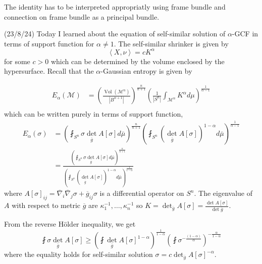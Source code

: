 \documentclass[12pt,a4paper]{article}
\begin{document}
The identity has to be interpreted appropriatly using frame bundle and connection on frame bundle as a principal bundle. 

(23/8/24) Today I learned about the equation of self-similar solution of $ \alpha $-GCF in terms of support function for $ \alpha \neq 1 $. The self-similar shrinker is given by 
\[ \left< X,\nu \right> = c K^{\alpha}\]
for some $ c>0 $ which can be determined by the volume enclosed by the hypersurface. Recall that the $ \alpha $-Gaussian entropy is given by 

\begin{align*}
   E_{\alpha}(\mathcal{M}) & = \left(\frac{\operatorname{Vol}\left(\mathcal{M}^n\right)}{\left|B^{n+1}\right|}\right)^{\frac{n}{n+1}}\left(\frac{1}{\left|S^n\right|} \int_{\mathcal{M}^n} K^\alpha d \mu\right)^{\frac{1}{\alpha-1}} \\
\end{align*}
which can be written purely in terms of support function, 
\begin{align*}
   E_{\alpha}(\sigma) &= \left( \fint_{S^{n}} \sigma \det_{\overline{g}} A[\sigma] d\bar{\mu}\right)^{\frac{n}{n+1}} \left( \fint_{S^{n}} (\det_{\overline{g}} A[\sigma])^{1-\alpha} d \bar{\mu} \right)^{\frac{1}{\alpha -1}}\\
   & = \frac{\left( \fint_{S^{n}} \sigma \det_{\overline{g}} A[\sigma] d\bar{\mu}\right)^{\frac{n}{n+1}}}{\left( \fint_{S^{n}} (\det_{\overline{g}} A[\sigma])^{1-\alpha} d \bar{\mu} \right)^{\frac{1}{1-\alpha}}}
\end{align*}
where $ A[\sigma]_{ij} = \overline{\nabla}_{i}\overline{\nabla}_{j}\sigma + \overline{g}_{ij}\sigma $ is a differential operator on $ S^{n} $. The eigenvalue of $ A $ with respect to metric $ \overline{g} $ are $ \kappa_{1}^{-1}, \dots, \kappa_{n}^{-1} $ so $ K = \det_{\overline{g}}A[\sigma] = \frac{\det A[\sigma]}{\det \overline{g}}$.

From the reverse H\"older inequality, we get 
\[ \fint \sigma \det_{\overline{g}}A[\sigma] \ge \left(\fint \det_{\overline{g}}A[\sigma]^{1-\alpha} \right)^{ \frac{1}{1-\alpha}} \left( \fint \sigma^{- \frac{(1-\alpha)}{\alpha}} \right)^{- \frac{\alpha}{1-\alpha}} \]
where the equality holds for self-similar solution $ \sigma = c \det_{\overline{g}}A[\sigma]^{-\alpha}. $ %
\end{document}
